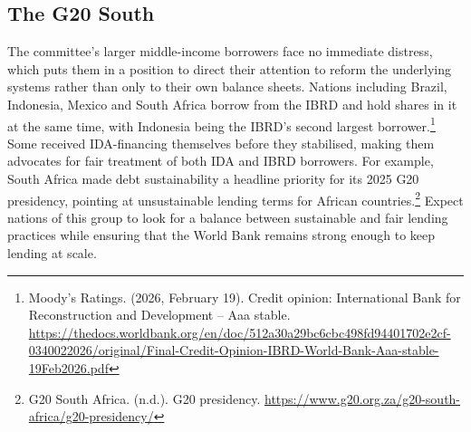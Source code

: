 \subsection{The G20 South}

The committee’s larger middle-income borrowers face no immediate distress, which puts them in a position to direct their attention to reform the underlying systems rather than only to their own balance sheets. Nations including Brazil, Indonesia, Mexico and South Africa borrow from the IBRD and hold shares in it at the same time, with Indonesia being the IBRD’s second largest borrower.\footnote{Moody’s Ratings. (2026, February 19). Credit opinion: International Bank for Reconstruction and Development – Aaa stable. \url{https://thedocs.worldbank.org/en/doc/512a30a29bc6cbc498fd94401702e2cf-0340022026/original/Final-Credit-Opinion-IBRD-World-Bank-Aaa-stable-19Feb2026.pdf}} Some received IDA-financing themselves before they stabilised, making them advocates for fair treatment of both IDA and IBRD borrowers. For example, South Africa made debt sustainability a headline priority for its 2025 G20 presidency, pointing at unsustainable lending terms for African countries.\footnote{G20 South Africa. (n.d.). G20 presidency. \url{https://www.g20.org.za/g20-south-africa/g20-presidency/}} Expect nations of this group to look for a balance between sustainable and fair lending practices while ensuring that the World Bank remains strong enough to keep lending at scale.
